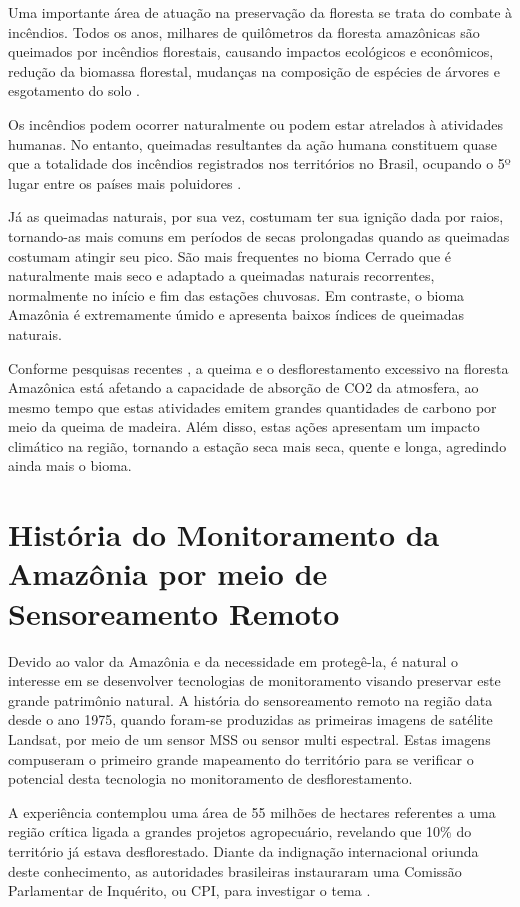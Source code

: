 Uma importante área de atuação na preservação da floresta se trata do combate à incêndios. Todos os anos, milhares de quilômetros da floresta amazônicas são queimados por incêndios florestais, causando impactos ecológicos e econômicos, redução da biomassa florestal, mudanças na composição de espécies de árvores e esgotamento do solo \cite{penha}. 

Os incêndios podem ocorrer naturalmente ou podem estar atrelados à atividades humanas. No entanto, queimadas resultantes da ação humana constituem quase que a totalidade dos incêndios registrados nos territórios no Brasil, ocupando o 5º lugar entre os países mais poluidores \cite{bdqueimadas}.

Já as queimadas naturais, por sua vez, costumam ter sua ignição dada por raios, tornando-as mais comuns em períodos de secas prolongadas quando as queimadas costumam atingir seu pico. São mais frequentes no bioma Cerrado que é naturalmente mais seco e adaptado a queimadas naturais recorrentes, normalmente no início e fim das estações chuvosas. Em contraste, o bioma Amazônia é extremamente úmido e apresenta baixos índices de queimadas naturais.

Conforme pesquisas recentes \cite{amazonia_carbono}, a queima e o desflorestamento excessivo na floresta Amazônica está afetando a capacidade de absorção de CO2 da atmosfera, ao mesmo tempo que estas atividades emitem grandes quantidades de carbono por meio da queima de madeira. Além disso, estas ações apresentam um impacto climático na região, tornando a estação seca mais seca, quente e longa, agredindo ainda mais o bioma.

\section{História do Monitoramento da Amazônia por meio de Sensoreamento Remoto}

Devido ao valor da Amazônia e da necessidade em protegê-la, é natural o interesse em se desenvolver tecnologias de monitoramento visando preservar este grande patrimônio natural. A história do sensoreamento remoto na região data desde o ano 1975, quando foram-se produzidas as primeiras imagens de satélite Landsat, por meio de um sensor MSS ou sensor multi espectral.  Estas imagens compuseram o primeiro grande mapeamento do território para se verificar o potencial desta tecnologia no monitoramento de desflorestamento.

A experiência contemplou uma área de 55 milhões de hectares referentes a uma região crítica ligada a grandes projetos agropecuário, revelando que 10\% do território já estava desflorestado. Diante da indignação internacional oriunda deste conhecimento, as autoridades brasileiras instauraram uma Comissão Parlamentar de Inquérito, ou CPI, para investigar o tema \cite{hist_amz}. 


